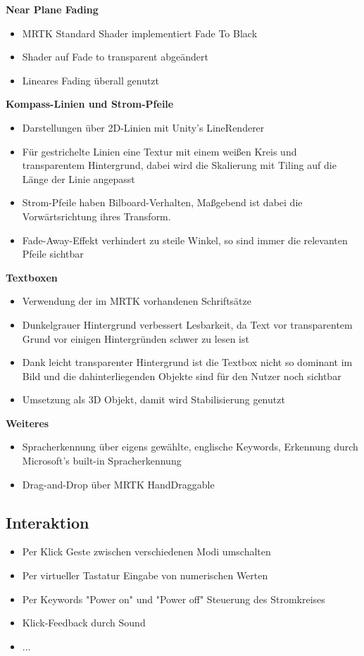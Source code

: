 \textbf{Near Plane Fading}
\begin{itemize}
	\item MRTK Standard Shader implementiert Fade To Black
	\item Shader auf Fade to transparent abgeändert
	\item Lineares Fading überall genutzt
\end{itemize}

\textbf{Kompass-Linien und Strom-Pfeile}
\begin{itemize}
	\item Darstellungen über 2D-Linien mit Unity's LineRenderer
	\item Für gestrichelte Linien eine Textur mit einem weißen Kreis und transparentem Hintergrund, dabei wird die Skalierung mit Tiling auf die Länge der Linie angepasst
	\item Strom-Pfeile haben Bilboard-Verhalten, Maßgebend ist dabei die Vorwärtsrichtung ihres Transform.
	\item Fade-Away-Effekt verhindert zu steile Winkel, so sind immer die relevanten Pfeile sichtbar
\end{itemize}

\textbf{Textboxen}
\begin{itemize}
	\item Verwendung der im MRTK vorhandenen Schriftsätze
	\item Dunkelgrauer Hintergrund verbessert Lesbarkeit, da Text vor transparentem Grund vor einigen Hintergründen schwer zu lesen ist
	\item Dank leicht transparenter Hintergrund ist die Textbox nicht so dominant im Bild und die dahinterliegenden Objekte sind für den Nutzer noch sichtbar
	\item Umsetzung als 3D Objekt, damit wird Stabilisierung genutzt
\end{itemize}

\textbf{Weiteres}
\begin{itemize}
	\item Spracherkennung über eigens gewählte, englische Keywords, Erkennung durch Microsoft's built-in Spracherkennung
	\item Drag-and-Drop über MRTK HandDraggable 
\end{itemize}

\subsection{Interaktion}
\begin{itemize}
	\item Per Klick Geste zwischen verschiedenen Modi umschalten
	\item Per virtueller Tastatur Eingabe von numerischen Werten
	\item Per Keywords "Power on" und "Power off" Steuerung des Stromkreises
	\item Klick-Feedback durch Sound
	\item ...
\end{itemize}

